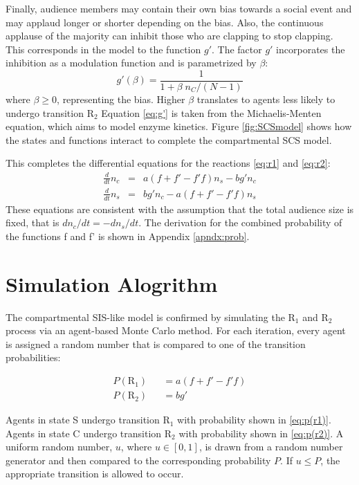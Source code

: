 Finally, audience members may contain their own bias towards a social event and may applaud longer or shorter depending on the bias.
Also, the continuous applause of the majority can inhibit those who are clapping to stop clapping.
This corresponds in the model to the function $g'$.
The factor $g'$ incorporates the inhibition as a modulation function and is parametrized by $\beta$: 
\begin{equation}\label{eq:g'}
  g'(\beta) = \frac{1}{1 + \beta\;n_C /(N-1)}
\end{equation}
where $\beta \geq 0$, representing the bias.
Higher $\beta$ translates to agents less likely to undergo transition $\mathrm{R}_{2}$ 
Equation \eqref{eq:g'} is taken from the Michaelis-Menten equation, which aims to model enzyme kinetics\cite{michaelisconstant}.
Figure \ref{fig:SCSmodel} shows how the states and functions interact to complete the compartmental SCS model.


This completes the differential equations for the reactions \eqref{eq:r1} and \eqref{eq:r2}:
\begin{eqnarray}
\frac{d}{dt}n_{c} &=& a (f+f'-f'f) n_{s} - b g' n_{c}\label{eq:diff1} \\
\frac{d}{dt}n_{s} &=& b g' n_{c} - a (f+f'-f'f) n_{s}\label{eq:diff2}
\end{eqnarray}
These equations are consistent with the assumption that the total audience size is fixed, that is $dn_{c}/dt = -dn_{s}/dt$.
The derivation for the combined probability of the functions f and f' is shown in Appendix \ref{apndx:prob}.



\section{Simulation Alogrithm}
\hspace{\parindent} The compartmental SIS-like model is confirmed by simulating the $\mathrm{R}_{1}$ and $\mathrm{R}_{2}$ process via an agent-based Monte Carlo method. For each iteration, every agent is assigned a random number that is compared to one of the transition probabilities:

\begin{eqnarray}
P(\mathrm{R}_{1}) &&= a(f + f' - f'f) \label{eq:p(r1)} \\
P(\mathrm{R}_{2}) &&= bg' \label{eq:p(r2)}
\end{eqnarray}

Agents in state S undergo transition $\mathrm{R}_{1}$ with probability shown in \eqref{eq:p(r1)}.
Agents in state C undergo transition $\mathrm{R}_{2}$ with probability shown in \eqref{eq:p(r2)}.
A uniform random number, $u$, where $u \in [0,1]$, is drawn from a random number generator and then compared to the corresponding probability $P$.
If $u \leq P$, the appropriate transition is allowed to occur.

